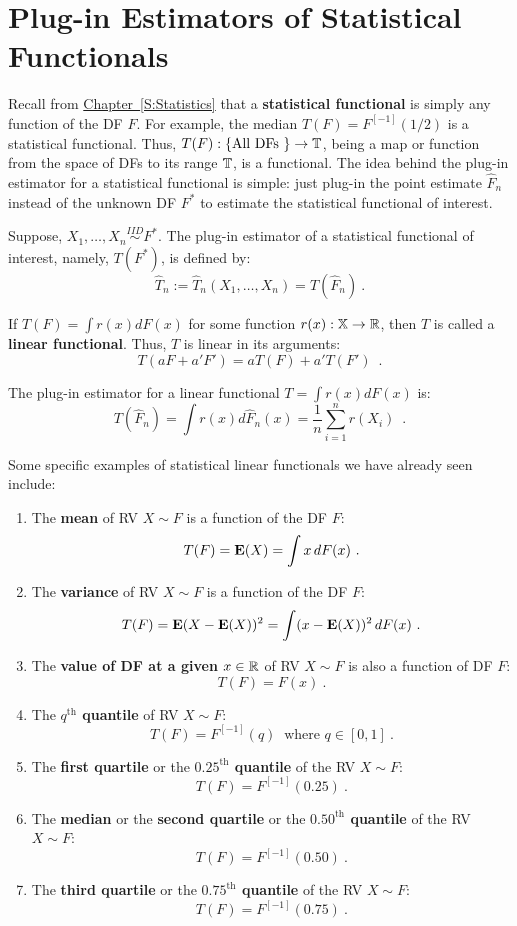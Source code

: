 \section{Plug-in Estimators of Statistical Functionals}\label{S:PlugIn}
Recall from \hyperref[S:Statistics]{Chapter~\ref*{S:Statistics}} that a {\bf statistical functional} is simply any function of the DF $F$.  For example, the median $T(F) = F^{[-1]}(1/2)$ is a statistical functional.  Thus, $T(F): \{ \text{All DFs }\} \to \mathbb{T}$, being a map or function from the space of DFs to its range $\mathbb{T}$, is a functional. 
The idea behind the plug-in estimator for a statistical functional is simple: just plug-in the point estimate $\widehat{F}_n$ instead of the unknown DF $F^*$ to estimate the statistical functional of interest.
\begin{definition}
Suppose, $X_1,\ldots,X_n \overset{IID}{\sim} F^*$.  The plug-in estimator of a statistical functional of interest, namely, $T(F^*)$, is defined by:
\[
\widehat{T}_n := \widehat{T}_n (X_1,\ldots,X_n) = T(\widehat{F}_n) \ .
\]
\end{definition}

\begin{definition}
If $T(F) = \int r(x) dF(x)$ for some function $r(x):\mathbb{X}\to \mathbb{R}$, then $T$ is called a {\bf linear functional}.  Thus, $T$ is linear in its arguments:
\[
T(a F + a' F') = a T(F) + a' T(F') \enspace .
\]
\end{definition}

\begin{prop}
The plug-in estimator for a linear functional $T = \int r(x) dF(x)$ is:
\[
\boxed{
T(\widehat{F}_n) = \int r(x) d \widehat{F}_n(x)=\frac{1}{n}\sum_{i=1}^n r(X_i) 
} \enspace .
\]
\end{prop}

Some specific examples of statistical linear functionals we have already seen include:
\begin{enumerate}
\item The {\bf mean} of RV $X \sim F$ is a function of the DF $F$:  
\[
T(F) = \e(X) = \int x\,dF(x) \ .
\]
\item The {\bf variance} of RV $X \sim F$ is a function of the DF $F$:  
\[
T(F) = \mathbf{E}(X-\mathbf{E}(X))^2 = \int (x-\mathbf{E}(X))^2\,dF(x) \ .
\]
\item The {\bf value of DF at a given $x \in \mathbb{R}$} of RV $X \sim F$ is also a function of DF $F$:
\[
T(F) = F(x) \  .
\]
\item The {\bf $q^{\text{th}}$ quantile} of RV $X \sim F$: 
\[
T(F) = F^{[-1]}(q) \ \text{ where } q \in [0,1] \ .
\]
\item The {\bf first quartile} or the {\bf $0.25^{\text{th}}$ quantile} of the RV $X \sim F$: 
\[
T(F) = F^{[-1]}(0.25) \ .
\]
\item The {\bf median} or the {\bf second quartile} or the {\bf $0.50^{\text{th}}$ quantile} of the RV $X \sim F$: 
\[
T(F) = F^{[-1]}(0.50) \  .
\]
\item The {\bf third quartile} or the {\bf $0.75^{\text{th}}$ quantile} of the RV $X \sim F$: 
\[
T(F) = F^{[-1]}(0.75) \ .
\]
\end{enumerate}


